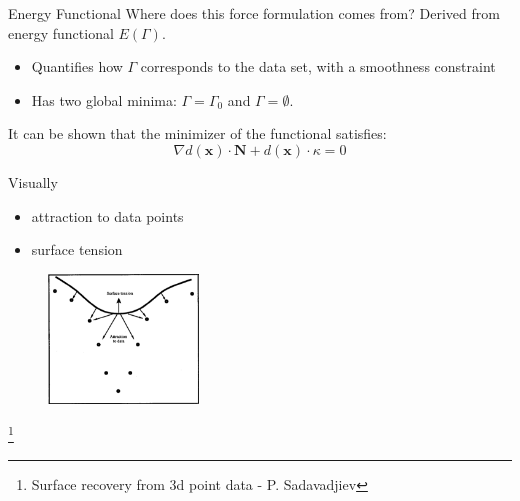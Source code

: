 \documentclass{beamer}
\begin{document}
\begin{frame}{Energy Functional}
Where does this force formulation comes from? Derived from energy functional $E(\Gamma)$.
\begin{itemize}
\item Quantifies how $\Gamma$ corresponds to the data set, with a smoothness constraint
\item Has two global minima: $\Gamma = \Gamma_0$  and $\Gamma = \emptyset$.
\end{itemize}
It can be shown that the minimizer of the functional satisfies:
\[
\nabla d(\mathbf{x}) \cdot \mathbf{N} + d(\mathbf{x}) \cdot \kappa = 0
\]
\end{frame}
\begin{frame}{Visually}
\begin{itemize}
\item attraction to data points
\item surface tension
\end{itemize}
\begin{figure}[H]
\centering
\includegraphics[width=40mm]{img/savadjiev3_3.png}
\end{figure}\footnote{Surface recovery from 3d point data - P. Sadavadjiev}
\end{frame}

\end{document}
